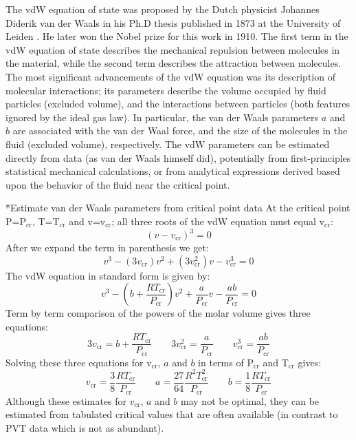 \documentclass[11pt]{article}
\makeatletter
\theoremstyle{definition}
\renewcommand\paragraph{\@startsection
	{paragraph}{2}{0mm}
	{-0.05in}
	{-0.5\baselineskip}
	{\normalfont\normalsize\itshape}}
\makeatother
\begin{document}
The vdW equation of state was proposed by the Dutch physicist Johannes Diderik van der Waals in his Ph.D thesis published in 1873 at the University of Leiden
\cite{vdW-Thesis}. He later won the Nobel prize for this work in 1910. The first term in the vdW equation of state describes the mechanical repulsion between molecules in the material,
while the second term describes the attraction between molecules.
The most significant advancements of the vdW equation was its description of molecular interactions;
its parameters describe the volume occupied by fluid particles (excluded volume),
and the interactions between particles (both features ignored by the ideal gas law).
In particular, the van der Waals parameters $a$ and $b$ are associated with the van der Waal force,
and the size of the molecules in the fluid (excluded volume), respectively.
The vdW parameters can be estimated directly from data (as van der Waals himself did), potentially from first-principles statistical mechanical calculations,
or from analytical expressions derived based upon the behavior of the fluid near the critical point.

\paragraph*{Estimate van der Waals parameters from critical point data}
At the critical point P=P$_{\mathrm{cr}}$, T=T$_{\mathrm{cr}}$ and v=v$_{\mathrm{cr}}$;
all three roots of the vdW equation must equal v$_{\mathrm{cr}}$:
\begin{equation}
  \left(v-v_{\mathrm{cr}}\right)^3 = 0
\end{equation}
After we expand the term in parenthesis we get:
\begin{equation}
v^3-\left(3v_{\mathrm{cr}}\right)v^2+\left(3v^{2}_{\mathrm{cr}}\right)v-v^{3}_{\mathrm{cr}} = 0
\end{equation}
The vdW equation in standard form is given by:
\begin{equation}
  v^3-\left(b+\frac{RT_{\mathrm{cr}}}{P_{\mathrm{cr}}}\right)v^2+\frac{a}{P_{\mathrm{cr}}}v-\frac{ab}{P_{\mathrm{cr}}} = 0
\end{equation}
Term by term comparison of the powers of the molar volume gives three equations:
\begin{equation}
  3v_{\mathrm{cr}} = b+\frac{RT_{\mathrm{cr}}}{P_{\mathrm{cr}}}\qquad
  3v^{2}_{\mathrm{cr}} = \frac{a}{P_{\mathrm{cr}}}\qquad
  v^{3}_{\mathrm{cr}} = \frac{ab}{P_{\mathrm{cr}}}
\end{equation}
Solving these three equations for v$_{\mathrm{cr}}$, $a$ and $b$ in terms of P$_{\mathrm{cr}}$ and T$_{\mathrm{cr}}$ gives:
\begin{equation}
  v_{\mathrm{cr}} = \frac{3}{8}\frac{RT_{\mathrm{cr}}}{P_{\mathrm{\mathrm{cr}}}}\qquad
  a = \frac{27}{64}\frac{R^{2}T^{2}_{\mathrm{cr}}}{P_{\mathrm{cr}}}\qquad
  b = \frac{1}{8}\frac{RT_{\mathrm{cr}}}{P_{\mathrm{cr}}}
\end{equation}
Although these estimates for $v_{\mathrm{cr}}$, $a$ and $b$ may not be optimal, they can be estimated from
tabulated critical values that are often available (in contrast to PVT data which is not as abundant).
\end{document}
